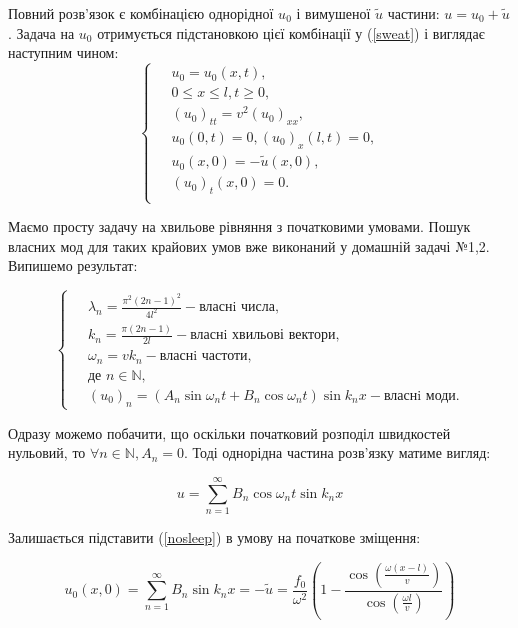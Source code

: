 Повний розв'язок є комбінацією однорідної $u_0$ і вимушеної $\tilde{u}$ частини: $u = u_0 + \tilde{u}$. Задача на $u_0$ отримується підстановкою цієї комбінації у (\ref{sweat}) і виглядає наступним чином: 
\begin{equation} 
    \left\{ \begin{aligned} %
            \;&u_0 = u_0(x,t), \\
            &0 \leq x \leq l, t \geq 0, \\
            &{(u_0)}_{tt}=v^2{(u_0)}_{xx}, \\
            &u_0(0,t) = 0, {(u_0)}_x(l,t) = 0,\\  
            &u_0(x,0) = -\tilde{u}(x,0),\\
            &{(u_0)}_t(x,0) = 0.\\
    \end{aligned} \right.
\end{equation}

Маємо просту задачу на хвильове рівняння з початковими умовами. Пошук власних мод для таких крайових умов вже виконаний у домашній задачі №1,2. Випишемо результат:

\begin{equation*} 
    \left\{ \begin{aligned} %
            \;&\lambda_n = \frac{\pi^2 (2n-1)^2}{4l^2} - \text{власнi числа},\\
            &k_n = \frac{\pi (2n-1)}{2l} - \text{власнi хвильові вектори},\\
            &\omega_n=vk_n - \text{власнi частоти},\\
            &\text{де } n \in \mathbb{N},\\ 
            &{(u_0)}_n = \left(A_n\sin\omega_nt + B_n\cos\omega_nt\right)\sin k_nx - \text{власнi моди}.       
    \end{aligned} \right.
\end{equation*}

Одразу можемо побачити, що оскільки початковий розподіл швидкостей нульовий, то $\forall n \in \mathbb{N}, A_n=0$. Тоді однорідна частина розв'язку матиме вигляд:

\begin{equation} \label{nosleep}
    u = \sum_{n=1}^\infty B_n\cos\omega_nt\sin k_nx
\end{equation}

Залишається підставити (\ref{nosleep}) в умову на початкове зміщення:

\begin{equation} 
    u_0(x,0) = \sum_{n=1}^\infty B_n\sin k_nx = -\tilde{u} = \frac{f_0}{\omega^2}\left(1 - \frac{\cos\left(\frac{\omega (x-l)}{v}\right)}{\cos\left(\frac{\omega l}{v}\right)}\right)
\end{equation}
 
